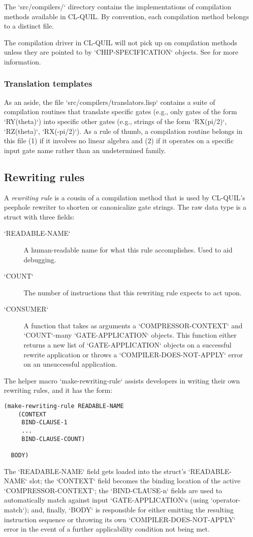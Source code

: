 The `src/compilers/` directory contains the implementations of compilation methods available in CL-QUIL.  By convention, each compilation method belongs to a distinct file.

The compilation driver in CL-QUIL will not pick up on compilation methods unless they are pointed to by `CHIP-SPECIFICATION` objects.  See  for more information.


\subsubsection*{Translation templates}

As an aside, the file `src/compilers/translators.lisp` contains a suite of compilation routines that translate specific gates (e.g., only gates of the form `RY(theta)`) into specific other gates (e.g., strings of the form `RX(pi/2)`, `RZ(theta)`, `RX(-pi/2)`).  As a rule of thumb, a compilation routine belongs in this file (1) if it involves no linear algebra and (2) if it operates on a specific input gate name rather than an undetermined family.



\subsection{Rewriting rules}

A \textit{rewriting rule} is a cousin of a compilation method that is used by CL-QUIL's peephole rewriter to shorten or canonicalize gate strings.  The raw data type is a struct with three fields:

\begin{description}
	\item[`READABLE-NAME`] A human-readable name for what this rule accomplishes. Used to aid debugging.
	\item[`COUNT`] The number of instructions that this rewriting rule expects to act upon.
	\item[`CONSUMER`] A function that takes as arguments a `COMPRESSOR-CONTEXT` and `COUNT`-many `GATE-APPLICATION` objects.  This function either returns a new list of `GATE-APPLICATION` objects on a successful rewrite application or throws a `COMPILER-DOES-NOT-APPLY` error on an unsuccessful application.
\end{description}

The helper macro `make-rewriting-rule` assists developers in writing their own rewriting rules, and it has the form:
\begin{verbatim}
(make-rewriting-rule READABLE-NAME
    (CONTEXT
     BIND-CLAUSE-1
     ...
     BIND-CLAUSE-COUNT)

  BODY)
\end{verbatim}
The `READABLE-NAME` field gets loaded into the struct's `READABLE-NAME` slot; the `CONTEXT` field becomes the binding location of the active `COMPRESSOR-CONTEXT`; the `BIND-CLAUSE-n` fields are used to automatically match against input `GATE-APPLICATION`s (using `operator-match`); and, finally, `BODY` is responsible for either emitting the resulting instruction sequence or throwing its own `COMPILER-DOES-NOT-APPLY` error in the event of a further applicability condition not being met.


